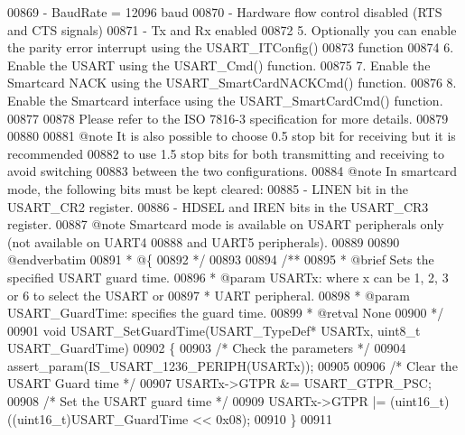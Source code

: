 \begin{DoxyCode}
00869 \textcolor{comment}{        - BaudRate = 12096 baud}
00870 \textcolor{comment}{        - Hardware flow control disabled (RTS and CTS signals)}
00871 \textcolor{comment}{        - Tx and Rx enabled}
00872 \textcolor{comment}{     5. Optionally you can enable the parity error interrupt using the USART\_ITConfig()}
00873 \textcolor{comment}{        function}
00874 \textcolor{comment}{     6. Enable the USART using the USART\_Cmd() function.}
00875 \textcolor{comment}{     7. Enable the Smartcard NACK using the USART\_SmartCardNACKCmd() function.}
00876 \textcolor{comment}{     8. Enable the Smartcard interface using the USART\_SmartCardCmd() function.}
00877 \textcolor{comment}{}
00878 \textcolor{comment}{  Please refer to the ISO 7816-3 specification for more details.}
00879 \textcolor{comment}{}
00880 \textcolor{comment}{}
00881 \textcolor{comment}{@note It is also possible to choose 0.5 stop bit for receiving but it is recommended }
00882 \textcolor{comment}{      to use 1.5 stop bits for both transmitting and receiving to avoid switching }
00883 \textcolor{comment}{      between the two configurations.}
00884 \textcolor{comment}{@note In smartcard mode, the following bits must be kept cleared:}
00885 \textcolor{comment}{        - LINEN bit in the USART\_CR2 register.}
00886 \textcolor{comment}{        - HDSEL and IREN bits in the USART\_CR3 register.}
00887 \textcolor{comment}{@note Smartcard mode is available on USART peripherals only (not available on UART4 }
00888 \textcolor{comment}{      and UART5 peripherals).}
00889 \textcolor{comment}{}
00890 \textcolor{comment}{@endverbatim}
00891 \textcolor{comment}{  * @\{}
00892 \textcolor{comment}{  */}
00893 
00894 \textcolor{comment}{/**}
00895 \textcolor{comment}{  * @brief  Sets the specified USART guard time.}
00896 \textcolor{comment}{  * @param  USARTx: where x can be 1, 2, 3 or 6 to select the USART or }
00897 \textcolor{comment}{  *         UART peripheral.}
00898 \textcolor{comment}{  * @param  USART\_GuardTime: specifies the guard time.   }
00899 \textcolor{comment}{  * @retval None}
00900 \textcolor{comment}{  */}
00901 \textcolor{keywordtype}{void} USART_SetGuardTime(USART\_TypeDef* USARTx, uint8\_t USART\_GuardTime)
00902 \{
00903   \textcolor{comment}{/* Check the parameters */}
00904   assert_param(IS\_USART\_1236\_PERIPH(USARTx));
00905 
00906   \textcolor{comment}{/* Clear the USART Guard time */}
00907   USARTx->GTPR &= USART_GTPR_PSC;
00908   \textcolor{comment}{/* Set the USART guard time */}
00909   USARTx->GTPR |= (uint16\_t)((uint16\_t)USART\_GuardTime << 0x08);
00910 \}
00911 

\end{DoxyCode}
